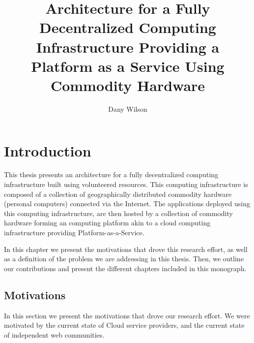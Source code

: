 \documentclass[12pt, titlepage]{uo_temp}
\title{Architecture for a Fully Decentralized Computing Infrastructure Providing a
  Platform as a Service Using Commodity Hardware}
\author{Dany Wilson}
\begin{document}
\maketitle 
\makeglossaries

\tableofcontents
\clearpage

\printglossary
\clearpage


     \chapter{Introduction}
     This thesis presents an architecture for a fully decentralized computing
     infrastructure built using volunteered resources. This computing infrastructure
     is composed of a collection of geographically distributed commodity hardware
     (personal computers) connected via the Internet. The applications deployed using this
     computing infrastructure, are then hosted by a collection of commodity hardware
     forming an computing platform akin to a cloud computing infrastructure providing
     Platform-as-a-Service.    
     
     In this chapter we present the motivations that drove this research effort, as well
     as a definition of the problem we are addressing in this thesis. Then, we outline our
     contributions and present the different chapters included in this monograph.

     \section{Motivations}
     In this section we present the motivations that drove our research effort. We were
     motivated by the current state of Cloud service providers, and the current state of
     independent web communities.
     
\end{document}
